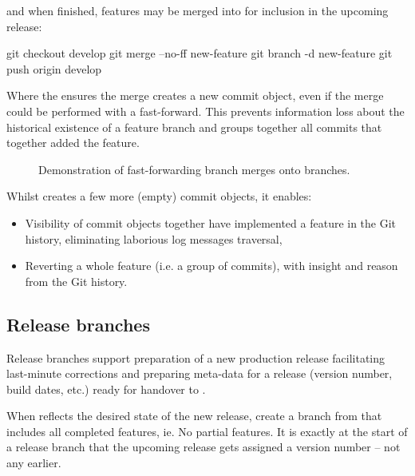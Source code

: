 \noindent and when finished, features may be merged into  for inclusion in the upcoming release:

\begin{git-bash}
    git checkout develop
    git merge --no-ff new-feature
    git branch -d new-feature
    git push origin develop
\end{git-bash}

Where the  ensures the merge creates a new commit object, even if the merge could be performed with a fast-forward. This prevents information loss about the historical existence of a feature branch and groups together all commits that together added the feature.

\vspace{12\baselineskip}%
\begin{figure}[H]
	\centering
	\noindent\resizebox{.66\textwidth}{!}{}
	\caption[Main branches]{Demonstration of fast-forwarding  branch merges onto  branches.}
\end{figure}

\noindent Whilst  creates a few more (empty) commit objects, it enables:

\begin{itemize}
	\item Visibility of commit objects together have implemented a feature in the Git history, eliminating laborious log messages traversal,
	\item Reverting a whole feature (i.e. a group of commits), with insight and reason from the Git history.
\end{itemize}



\subsection{Release branches}

Release branches support preparation of a new production release facilitating last-minute corrections and preparing meta-data for a release (version number, build dates, etc.) ready for handover to .

When  reflects the desired state of the new release, create a  branch from  that includes all completed features, ie. No partial features. It is exactly at the start of a release branch that the upcoming release gets assigned a version number -- not any earlier. 

